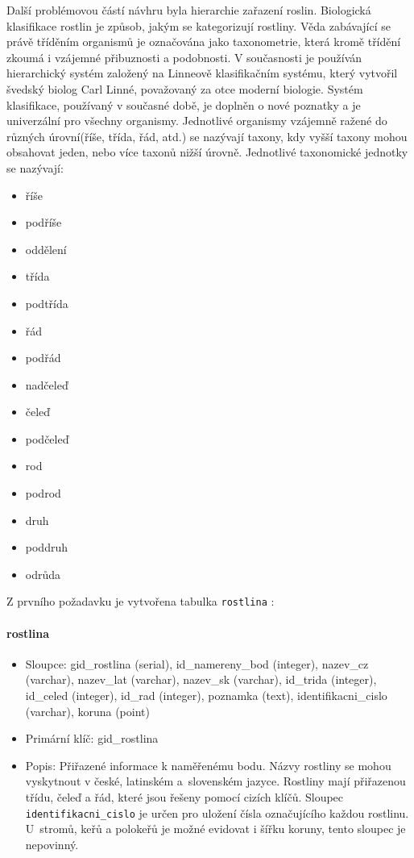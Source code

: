 \documentclass[12pt]{article}%
\begin{document}
{{%
Další problémovou částí návhru byla hierarchie zařazení roslin. Biologická klasifikace rostlin je 
způsob, jakým se kategorizují rostliny. Věda zabávající se právě tříděním organismů je označována 
jako taxonometrie, která kromě třídění zkoumá i vzájemné přibuznosti a podobnosti. V současnosti je 
používán hierarchický systém založený na Linneově klasifikačním systému, který vytvořil švedský 
biolog Carl Linné, považovaný za otce moderní biologie. Systém klasifikace, používaný v současné 
době, je doplněn o nové poznatky a je univerzální pro všechny organismy. Jednotlivé organismy 
vzájemně ražené do různých úrovní(říše, třída, řád, atd.) se nazývají taxony, kdy vyšší taxony 
mohou obsahovat jeden, nebo více taxonů nižší úrovně. Jednotlivé taxonomické jednotky se nazývají:
\begin{itemize}
\item říše
\item podříše
\item oddělení
\item třída
\item podtřída
\item řád
\item podřád
\item nadčeleď
\item čeleď
\item podčeleď
\item rod
\item podrod
\item druh
\item poddruh
\item odrůda
\end{itemize}


Z prvního požadavku je vytvořena tabulka \texttt{rostlina} :
\paragraph{rostlina}
\begin{itemize}
\item Sloupce: gid\_rostlina (serial), id\_namereny\_bod (integer), nazev\_cz (varchar),
nazev\_lat (varchar), nazev\_sk (varchar), id\_trida (integer), id\_celed (integer), id\_rad (integer),
poznamka (text), identifikacni\_cislo (varchar), koruna (point)
\item Primární klíč: gid\_rostlina
\item Popis: Přiřazené informace k naměřenému bodu. Názvy rostliny se mohou vyskytnout v české, latinském 
a~slovenském jazyce. Rostliny mají přiřazenou třídu, čeleď a řád, které jsou řešeny pomocí cizích klíčů.
Sloupec \texttt{identifikacni\_cislo} je určen pro uložení čísla označujícího každou rostlinu. U~stromů, keřů a polokeřů
je možné evidovat i šířku koruny, tento sloupec je nepovinný.
\end{itemize}

}}
\end{document}
